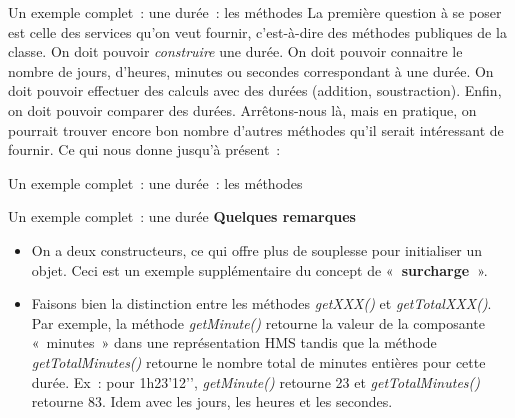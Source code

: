 \begin{frame}{Un exemple complet~: une durée~: les méthodes}
	La première question à se poser est celle des services qu’on veut
	fournir, c’est-à-dire des méthodes publiques de la classe. On doit
	pouvoir \textit{construire} une durée. On doit pouvoir connaitre le
	nombre de jours, d’heures, minutes ou secondes correspondant à une durée. On doit
	pouvoir effectuer des calculs avec des durées (addition, soustraction).
	Enfin, on doit pouvoir comparer des durées. Arrêtons-nous là, mais en
	pratique, on pourrait trouver encore bon nombre d’autres méthodes qu’il
	serait intéressant de fournir. Ce qui nous donne jusqu’à présent~:
\end{frame}

\begin{frame}{Un exemple complet~: une durée~: les méthodes}
\end{frame}

\begin{frame}{Un exemple complet~: une durée}
	\textbf{Quelques remarques}
		\begin{itemize}
			\item {
				On a deux constructeurs, ce qui offre plus de souplesse pour initialiser
				un objet. Ceci est un exemple supplémentaire du concept de
				«\textbf{~surcharge~}».}
			\item {
				Faisons bien la distinction entre les méthodes
				\textit{getXXX()} et \textit{getTotalXXX()}. Par
				exemple, la méthode \textit{getMinute()} retourne la valeur
				de la composante «~minutes~» dans une représentation HMS tandis que la
				méthode \textit{getTotalMinutes()} retourne le nombre total
				de minutes entières pour cette durée. Ex~: pour 1h23’12’’,
				\textit{getMinute()} retourne 23 et
				\textit{getTotalMinutes()} retourne 83. Idem avec 
				les jours, les heures	et les secondes.}
		\end{itemize}
\end{frame}

